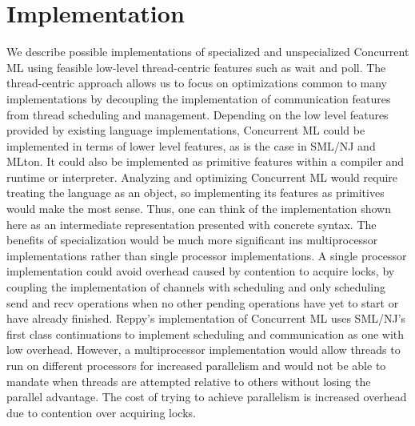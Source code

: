 \documentclass{article}
\begin{document}
\section{Implementation}
We describe possible implementations of specialized and unspecialized Concurrent ML using feasible low-level thread-centric features such as wait and poll.  The thread-centric approach allows us to focus on optimizations common to many implementations by decoupling the implementation of communication features from thread scheduling and management.  Depending on the low level features provided by existing language implementations, Concurrent ML could be implemented in terms of lower level features, as is the case in SML/NJ and MLton.  It could also be implemented as primitive features within a compiler and runtime or interpreter.  Analyzing and optimizing Concurrent ML would require treating the language as an object, so implementing its features as primitives would make the most sense.  Thus, one can think of the implementation shown here as an intermediate representation presented with concrete syntax.
	The benefits of specialization would be much more significant ins multiprocessor implementations rather than single processor implementations.  A single processor implementation could avoid overhead caused by contention to acquire locks, by coupling the implementation of channels with scheduling and only scheduling send and recv operations when no other pending operations have yet to start or have already finished.  Reppy's implementation of Concurrent ML uses SML/NJ's first class continuations to implement scheduling and communication as one with low overhead.  However, a multiprocessor implementation would allow threads to run on different processors for increased parallelism and would not be able to mandate when threads are attempted relative to others without losing the parallel advantage.  The cost of trying to achieve parallelism is increased overhead due to contention over acquiring locks.
\end{document}
